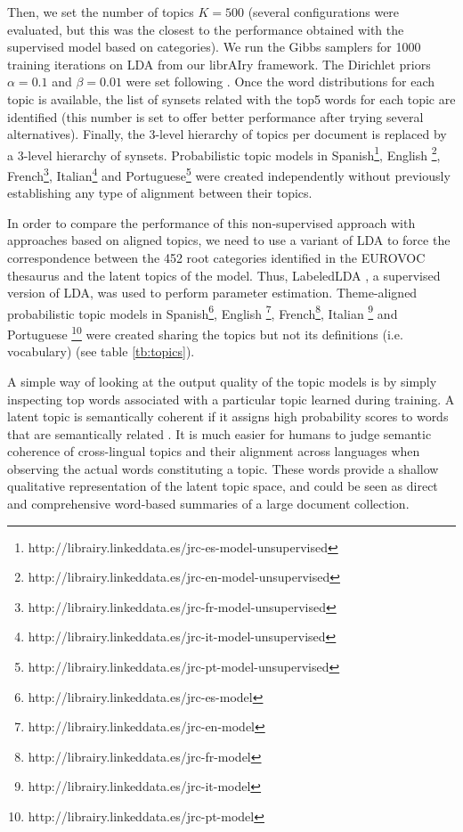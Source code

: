  Then, we set the number of topics $K=500$ (several configurations were evaluated, but this was the closest to the performance obtained with the supervised model based on categories). We run the Gibbs samplers for 1000 training iterations on LDA from our librAIry framework. The Dirichlet priors $\alpha=0.1$ and $\beta=0.01$ were set following \citep{Hu2014a}. Once the word distributions for each topic is available, the list of synsets related with the top5 words for each topic are identified (this number is set to offer better performance after trying several alternatives). Finally, the 3-level hierarchy of topics per document is replaced by a 3-level hierarchy of synsets. Probabilistic topic models in Spanish\footnote{http://librairy.linkeddata.es/jrc-es-model-unsupervised}, English \footnote{http://librairy.linkeddata.es/jrc-en-model-unsupervised}, French\footnote{http://librairy.linkeddata.es/jrc-fr-model-unsupervised}, Italian\footnote{http://librairy.linkeddata.es/jrc-it-model-unsupervised} and Portuguese\footnote{http://librairy.linkeddata.es/jrc-pt-model-unsupervised} were created independently without previously establishing any type of alignment between their topics.
 
 In order to compare the performance of this non-supervised approach with approaches based on aligned topics, we need to use a variant of LDA to force the correspondence between the 452 root categories identified in the EUROVOC thesaurus and the latent topics of the model. Thus, LabeledLDA \citep{Ramage2009a}, a supervised version of LDA, was used to perform parameter estimation. Theme-aligned probabilistic topic models in Spanish\footnote{http://librairy.linkeddata.es/jrc-es-model}, English \footnote{http://librairy.linkeddata.es/jrc-en-model}, French\footnote{http://librairy.linkeddata.es/jrc-fr-model}, Italian \footnote{http://librairy.linkeddata.es/jrc-it-model} and Portuguese \footnote{http://librairy.linkeddata.es/jrc-pt-model} were created sharing the topics but not its definitions (i.e. vocabulary) (see table \ref{tb:topics}).

A simple way of looking at the output quality of the topic models is by simply inspecting top words associated with a particular topic learned during training. A latent topic is semantically coherent if it assigns high probability scores to words that are semantically related \citep{Gliozzo2007, newman-etal-2010-automatic, mimno-etal-2011-optimizing}. It is much easier for humans to judge semantic coherence of cross-lingual topics and their alignment across languages when observing the actual words constituting a topic. These words provide a shallow qualitative representation of the latent topic space, and could be seen as direct and comprehensive word-based summaries of a large document collection.


